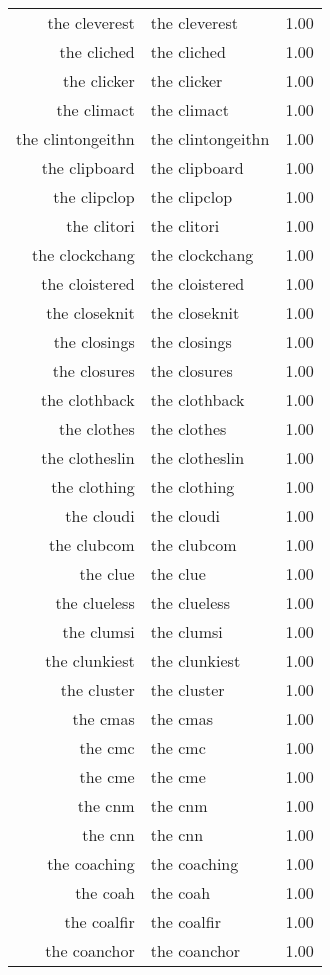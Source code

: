 \begin{table}[ht]
\begin{tabular}{rlr}
  the cleverest & the cleverest & 1.00 \\ 
  the cliched & the cliched & 1.00 \\ 
  the clicker & the clicker & 1.00 \\ 
  the climact & the climact & 1.00 \\ 
  the clintongeithn & the clintongeithn & 1.00 \\ 
  the clipboard & the clipboard & 1.00 \\ 
  the clipclop & the clipclop & 1.00 \\ 
  the clitori & the clitori & 1.00 \\ 
  the clockchang & the clockchang & 1.00 \\ 
  the cloistered & the cloistered & 1.00 \\ 
  the closeknit & the closeknit & 1.00 \\ 
  the closings & the closings & 1.00 \\ 
  the closures & the closures & 1.00 \\ 
  the clothback & the clothback & 1.00 \\ 
  the clothes & the clothes & 1.00 \\ 
  the clotheslin & the clotheslin & 1.00 \\ 
  the clothing & the clothing & 1.00 \\ 
  the cloudi & the cloudi & 1.00 \\ 
  the clubcom & the clubcom & 1.00 \\ 
  the clue & the clue & 1.00 \\ 
  the clueless & the clueless & 1.00 \\ 
  the clumsi & the clumsi & 1.00 \\ 
  the clunkiest & the clunkiest & 1.00 \\ 
  the cluster & the cluster & 1.00 \\ 
  the cmas & the cmas & 1.00 \\ 
  the cmc & the cmc & 1.00 \\ 
  the cme & the cme & 1.00 \\ 
  the cnm & the cnm & 1.00 \\ 
  the cnn & the cnn & 1.00 \\ 
  the coaching & the coaching & 1.00 \\ 
  the coah & the coah & 1.00 \\ 
  the coalfir & the coalfir & 1.00 \\ 
  the coanchor & the coanchor & 1.00 \\ 

\end{tabular}
\end{table}
